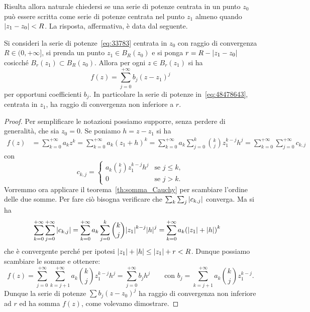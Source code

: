 Risulta allora naturale chiedersi se 
una serie di potenze centrata in un punto $z_0$
può essere scritta come serie di potenze centrata 
nel punto $z_1$ almeno quando ${\left|z_1-z_0\right|}<R$.
La risposta, affermativa, è data dal seguente.

\begin{theorem}
\label{th:488456367}
Si consideri la serie di potenze~\eqref{eq:33783} centrata in $z_0$
con raggio di convergenza
$R\in (0,+\infty]$, si prenda un punto $z_1 \in B_R(z_0)$
e si ponga $r=R-{\left|z_1-z_0\right|}$ cosicché $B_r(z_1)\subset B_R(z_0)$.
Allora
per ogni $z\in B_r(z_1)$ si ha
\begin{equation}\label{eq:48478643}
  f(z) = \sum_{j=0}^{+\infty} b_j (z - z_1)^j
\end{equation}
per opportuni coefficienti $b_j$. In particolare la serie
di potenze in~\eqref{eq:48478643}, centrata in $z_1$,
ha raggio di convergenza non inferiore a $r$.
\end{theorem}
%
\begin{proof}
Per semplificare le notazioni possiamo supporre, senza perdere di generalità,
che sia $z_0=0$. Se poniamo $h=z-z_1$ si ha
\begin{align*}
f(z) 
&= \sum_{k=0}^{+\infty} a_k z^k 
= \sum_{k=0}^{+\infty} a_k (z_1+h)^k
= \sum_{k=0}^{+\infty} a_k \sum_{j=0}^k {k \choose j}z_1^{k-j}h^j
= \sum_{k=0}^{+\infty} \sum_{j=0}^{+\infty} c_{k,j}
\end{align*}
con 
\[
  c_{k,j} = \begin{cases}
    a_k {k \choose j} z_1^{k-j} h^j & \text{se $j\le k$},\\
    0 & \text{se $j>k$}.
  \end{cases}
\]
Vorremmo ora applicare il teorema~\ref{th:somma_Cauchy}
per scambiare l'ordine delle due somme.
Per fare ciò bisogna verificare che 
$\sum_k \sum_j {\left|c_{k,j}\right|}$ converga.
Ma si ha 
\begin{align*}
  \sum_{k=0}^{+\infty}\sum_{j=0}^{+\infty}{\left|c_{k,j}\right|}
  &= \sum_{k=0}^{+\infty} a_k \sum_{j=0}^k {k \choose j}{\left|z_1\right|}^{k-j}{\left|h\right|}^j 
  = \sum_{k=0}^{+\infty} a_k {\left( {\left|z_1\right|}+{\left|h\right|} \right)}^k
\end{align*}
che è convergente perché per ipotesi ${\left|z_1\right|}+{\left|h\right|} \le {\left|z_1\right|} + r < R$. 
Dunque possiamo scambiare le somme e ottenere:
\[
  f(z) = \sum_{j=0}^{+\infty} \sum_{k=j+1}^{+\infty} a_k {k\choose j} z_1^{k-j} h^j
    = \sum_{j=0}^{+\infty} b_j h^j
  \qquad\text{con }
b_j = \sum_{k=j+1}^{+\infty}
 a_k {k\choose j}z_1^{k-j}.
\]
Dunque la serie di potenze $\sum b_j (z-z_0)^j$ 
ha raggio di convergenza non inferiore ad $r$ 
ed ha somma $f(z)$, come volevamo dimostrare.
\end{proof}

